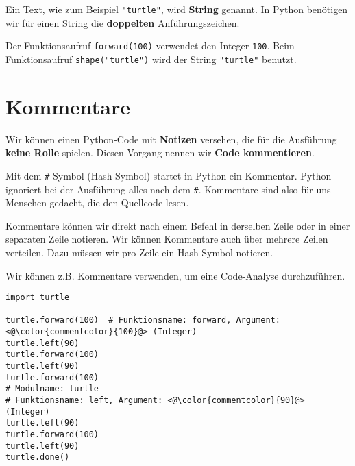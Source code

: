 \begin{definition}[String]
    Ein Text, wie zum Beispiel \lstinline[language={python3}]{"turtle"}, wird \textbf{String} genannt. In Python benötigen wir für einen String die \textbf{doppelten} Anführungszeichen.
\end{definition}

\begin{example}
    Der Funktionsaufruf \lstinline[language={python3}]{forward(100)} verwendet den Integer \lstinline[language={python3}]{100}. Beim Funktionsaufruf \lstinline[language={python3}]{shape("turtle")} wird der String \lstinline[language={python3}]{"turtle"} benutzt.
\end{example}


\section{Kommentare}

Wir können einen Python-Code mit \textbf{Notizen} versehen, die für die Ausführung \textbf{keine Rolle} spielen. Diesen Vorgang nennen wir \textbf{Code kommentieren}.

\begin{definition}
Mit dem \lstinline[language={python3}]{#} Symbol (Hash-Symbol) startet in Python ein Kommentar. Python ignoriert bei der Ausführung alles nach dem \lstinline[language={python3}]{#}. Kommentare sind also für uns Menschen gedacht, die den Quellcode lesen.
\end{definition}

Kommentare können wir direkt nach einem Befehl in derselben Zeile oder in einer separaten Zeile notieren. Wir können Kommentare auch über mehrere Zeilen verteilen. Dazu müssen wir pro Zeile ein Hash-Symbol notieren.

\begin{example}
Wir können z.B. Kommentare verwenden, um eine Code-Analyse durchzuführen.
\begin{lstlisting}[language={python3}, caption={Code-Analyse mit Kommentaren (\graybgtexttt{bsp\_1.py}).}, label={lst:code-analyse}]
import turtle

turtle.forward(100)  # Funktionsname: forward, Argument: <@\color{commentcolor}{100}@> (Integer)
turtle.left(90)
turtle.forward(100)
turtle.left(90)
turtle.forward(100)
# Modulname: turtle
# Funktionsname: left, Argument: <@\color{commentcolor}{90}@> (Integer)
turtle.left(90)
turtle.forward(100)
turtle.left(90)
turtle.done()

\end{lstlisting}
\end{example}



